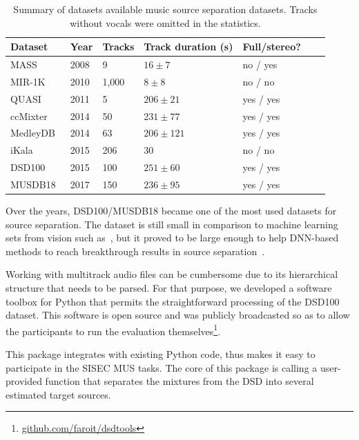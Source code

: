 \begin{table}[htbp]
	\centering
  \begin{tabular}{l l l l l l l}
    \toprule
    \textbf{Dataset} & \textbf{Year} & \textbf{Tracks} & \textbf{Track duration (s)} & \textbf{Full/stereo?}\\
    \midrule
    MASS~\cite{MTGMASSdb} & 2008 & 9 & $16 \pm 7$ & no / yes \\
    MIR-1K~\cite{hsu10} & 2010 & 1,000 & $8 \pm 8$ & no / no \\
    QUASI~\cite{liutkus11,vincent12} & 2011 & 5 & $206 \pm 21$ & yes / yes \\
    ccMixter~\cite{liutkus142} & 2014 & 50 & $231 \pm 77 $ & yes / yes \\
    MedleyDB~\cite{bittner14} & 2014 & 63 & $206 \pm 121$ & yes / yes \\
    iKala~\cite{chan15} & 2015 & 206 & 30 & no / no \\
    DSD100~\cite{liutkus17} & 2015 & 100 & $251 \pm 60$ & yes / yes \\
    MUSDB18~\cite{stoeter18sisec} & 2017 & 150 & $236 \pm 95$ & yes / yes \\
    \bottomrule
  \end{tabular}
  \caption{Summary of datasets available music source separation datasets. Tracks without vocals were omitted in the statistics.}
	\label{tab:datasets}
\end{table}

Over the years, DSD100/MUSDB18 became one of the most used datasets for source separation. 
The dataset is still small in comparison to machine learning sets from vision such as~\cite{imagenet09}, but it proved to be large enough to help DNN-based methods to reach breakthrough results in source separation~\cite{stoeter18sisec}.
\par
Working with multitrack audio files can be cumbersome due to its hierarchical structure that needs to be parsed.
For that purpose, we developed a software toolbox for Python that permits the straightforward processing of the DSD100 dataset. This software is open source and was publicly broadcasted so as to allow the participants to run the evaluation themselves\footnote{\url{github.com/faroit/dsdtools}}.
\par
This package integrates with existing Python code, thus makes it easy to participate in the SISEC MUS tasks. The core of this package is calling a user-provided function that separates the mixtures from the DSD into several estimated target sources.

